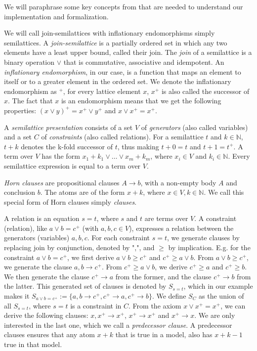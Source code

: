 We will paraphrase some key concepts from \cite{mbezem} that are needed to understand
our implementation and formalization.

We will call join-semilattices with inflationary endomorphisms simply semilattices.
A \textit{join-semilattice} is a partially ordered set in which any two elements have a least upper bound,
called their join.
The \textit{join} of a semilattice is a binary operation $\lor$ that is commutative, associative and idempotent.
An \textit{inflationary endomorphism}, in our case, is a function
that maps an element to itself or to a greater element in the ordered set.
We denote the inflationary endomorphism as $^+$, for every lattice element $x$,
$x^+$ is also called the successor of $x$.
The fact that $x$ is an endomorphism means that we get the following properties:
$(x \lor y)^+ = x^+ \lor y^+$ and $x \lor x^+ = x^+$.


A \textit{semilattice presentation} consists of a set $V$ of \textit{generators}
(also called variables) and a set $C$ of \textit{constraints}
(also called relations).
For a semilattice $t$ and $k \in \mathbb{N}$, $t + k$ denotes the k-fold successor of $t$, thus making $t + 0 = t$ and $t + 1 = t^+$.
A term over $V$ has the form $x_1 + k_1 \lor \ldots \lor x_m + k_m$, where $x_i \in V$ and $k_i \in \mathbb{N}$.
Every semilattice expression is equal to a term over $V$.

\textit{Horn clauses} are propositional clauses $A \rightarrow b$, with a non-empty body $A$ and conclusion $b$.
The atoms are of the form $x + k$, where $x \in V, k \in \mathbb{N}$.
We call this special form of Horn clauses simply \textit{clauses}.

A relation is an equation $s = t$, where $s$ and $t$ are terms over $V$.
A constraint (relation), like $a \lor b = c^+$ (with $a, b, c \in V$), expresses a relation between the generators (variables) $a, b, c$.
For each constraint $s = t$, we generate clauses by replacing join by conjunction, denoted by ",", and $\geq$ by implication.
E.g. for the constraint $a \lor b = c^+$, we first derive $a \lor b \geq c^+$ and $c^+ \geq a \lor b$.
From $a \lor b \geq c^+$, we generate the clause $a, b \rightarrow c^+$.
From $c^+ \geq a \lor b$, we derive $c^+ \geq a$ and $c^+ \geq b$.
We then generate the clause $c^+ \rightarrow a$ from the former, and the clause $c^+ \rightarrow b$ from the latter.
This generated set of clauses is denoted by $S_{s=t}$, which in our example makes it
$S_{a \lor b = c^+} := \{a, b \rightarrow c^+, c^+ \rightarrow a, c^+ \rightarrow b\}$.
We define $S_C$ as the union of all $S_{s=t}$, where $s = t$ is a constraint in $C$.
From the axiom $x \lor x^+ = x^+$, we can derive the following clauses:
$x, x^+ \rightarrow x^+$,
$x^+ \rightarrow x^+$ and $x^+ \rightarrow x$.
We are only interested in the last one, which we call a \textit{predecessor clause}.
A predecessor clauses ensures that any atom $x + k$ that is true in a model,
also has $x + k - 1$ true in that model.

